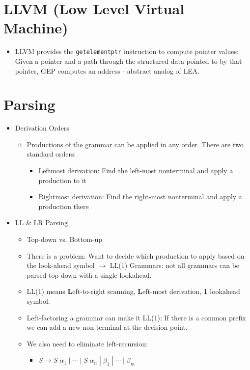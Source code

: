 \section*{LLVM (Low Level Virtual Machine)}
\begin{itemize}
	\item LLVM provides the \texttt{getelementptr} instruction to compute pointer values: Given a pointer and a path through the structured data pointed to by that pointer, GEP computes an address - abstract analog of LEA.
\end{itemize}


\section*{Parsing}
\begin{itemize}
	\item Derivation Orders
	\begin{itemize}
		\item Productions of the grammar can be applied in any order. There are two standard orders:
		\begin{itemize}
			\item Leftmost derivation: Find the left-most nonterminal and apply a production to it
			\item Rightmost derivation: Find the right-most nonterminal and apply a production there
		\end{itemize}
	\end{itemize}
	\item LL \& LR Parsing
	\begin{itemize}

		\item Top-down vs. Bottom-up
		\item There is a problem: Want to decide which production to apply based on the look-ahead symbol $\rightarrow$ LL(1) Grammars: not all grammars can be parsed top-down with a single lookahead.
		\item LL(1) means \textbf{L}eft-to-right scanning, \textbf{L}eft-most derivation, \textbf{1} lookahead symbol.
		\item Left-factoring a grammar can make it LL(1): If there is a common prefix we can add a new non-terminal at the decision point.
		\item We also need to eliminate left-recursion: 
		\begin{itemize}
			\item $S \rightarrow S\; \alpha_1 \;|\; \cdots \;|\; S\; \alpha _n \;|\; \beta _1 \;|\; \cdots \;|\; \beta_m$
			

\end{itemize}
\end{itemize}
\end{itemize}
